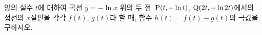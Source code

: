 양의 실수 $t$에 대하여 곡선 $y=-\ln x$ 위의 두 점~$\mathrm{P}(t{,}\mkern3mu\mathopen{}-\ln t)$, $\mathrm{Q}(2t{,}\mkern3mu\mathopen{}-\ln 2t)$에서의 접선의 $x$절편을 각각 $f(t)$, $g(t)$라 할 때, 함수 $h(t)=f(t)-g(t)$의 극값을 구하시오.
